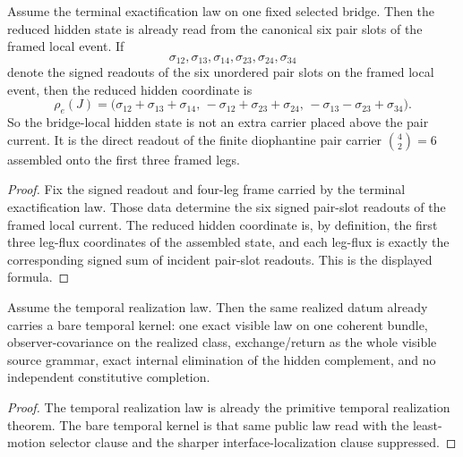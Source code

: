 \begin{theorem}
\label{thm:terminal-exactification-reads-the-hidden-state-from-the-six-pair-slots}
Assume the terminal exactification law on one fixed selected bridge. Then the
reduced hidden state is already read from the canonical six pair slots of the
framed local event. If
\[
\sigma_{12},\sigma_{13},\sigma_{14},\sigma_{23},\sigma_{24},\sigma_{34}
\]
denote the signed readouts of the six unordered pair slots on the framed local
event, then the reduced hidden coordinate is
\[
\rho_e(J)=
\bigl(
\sigma_{12}+\sigma_{13}+\sigma_{14},\,
-\sigma_{12}+\sigma_{23}+\sigma_{24},\,
-\sigma_{13}-\sigma_{23}+\sigma_{34}
\bigr).
\]
So the bridge-local hidden state is not an extra carrier placed above the pair
current. It is the direct readout of the finite diophantine pair carrier
\(\binom{4}{2}=6\) assembled onto the first three framed legs.
\end{theorem}

\begin{proof}
Fix the signed readout and four-leg frame carried by the terminal
exactification law. Those data determine the six signed pair-slot readouts of
the framed local current. The reduced hidden coordinate is, by definition, the
first three leg-flux coordinates of the assembled state, and each leg-flux is
exactly the corresponding signed sum of incident pair-slot readouts. This is
the displayed formula.
\end{proof}

\begin{theorem}
\label{thm:bare-temporal-kernel-carried-by-the-primitive-temporal-surface}
Assume the temporal realization law. Then the same realized datum already
carries a bare temporal kernel: one exact visible law on one coherent bundle,
observer-covariance on the realized class, exchange/return as the whole visible
source grammar, exact internal elimination of the hidden complement, and no
independent constitutive completion.
\end{theorem}

\begin{proof}
The temporal realization law is already the primitive temporal realization
theorem. The bare temporal kernel is that same public law read with the
least-motion selector clause and the sharper interface-localization clause
suppressed.
\end{proof}

